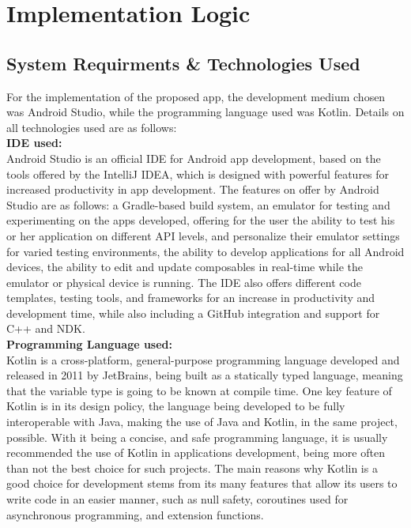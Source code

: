 
\chapter{Implementation Logic}\label{chapter:chap4}

\section{System Requirments \& Technologies Used}\label{sect:System Requirments \& Technologies Used}

For the implementation of the proposed app, the development medium chosen was Android Studio, while the programming language used was Kotlin. Details on all technologies used are as follows:\\

\textbf{\ac{IDE} used: }  \\
Android Studio \cite{1} is an official \ac{IDE} for Android app development, based on the tools offered by the IntelliJ IDEA, which is designed with powerful features for increased productivity in app development. The features on offer by Android Studio are as follows: a Gradle-based build system, an emulator for testing and experimenting on the apps developed, offering for the user the ability to test his or her application on different \ac{API} levels, and personalize their emulator settings for varied testing environments, the ability to develop applications for all Android devices, the ability to edit and update composables in real-time while the emulator or physical device is running. The \ac{IDE} also offers different code templates, testing tools, and frameworks for an increase in productivity and development time, while also including a GitHub integration and support for C++ and \ac{NDK}.
\\

\textbf{Programming Language used: } \\
Kotlin \cite{5} is a cross-platform, general-purpose programming language developed and released in 2011 by JetBrains, being built as a statically typed language, meaning that the variable type is going to be known at compile time. One key feature of Kotlin is in its design policy, the language being developed to be fully interoperable with Java, making the use of Java and Kotlin, in the same project, possible. With it being a concise, and safe programming language, it is usually recommended the use of Kotlin in applications development, being more often than not the best choice for such projects. The main reasons why Kotlin is a good choice for development stems from its many features that allow its users to write code in an easier manner, such as null safety, coroutines used for asynchronous programming, and extension functions. 


